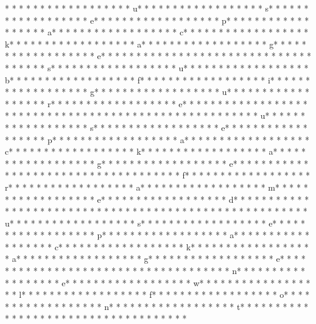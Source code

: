 * * *  * * *  * * *  *  * * *  *  * * *  * u* * *  * * *  * * *  *  * * *  *  * * *  * s* * *  * * *  * * *  *  * * *  *  * * *  * e* * *  * * *  * * *  *  * * *  *  * * *  * p* * *  * * *  * * *  *  * * *  *  * * *  * a* * *  * * *  * * *  *  * * *  *  * * *  * c* * *  * * *  * * *  *  * * *  *  * * *  * k* * *  * * *  * * *  *  * * *  *  * * *  * a* * *  * * *  * * *  *  * * *  *  * * *  * g* * *  * * *  * * *  *  * * *  *  * * *  * e* * *  * * *  * * *  *  * * *  *  * * *  * {* * *  * * *  * * *  *  * * *  *  * * *  * s* * *  * * *  * * *  *  * * *  *  * * *  * u* * *  * * *  * * *  *  * * *  *  * * *  * b* * *  * * *  * * *  *  * * *  *  * * *  * f* * *  * * *  * * *  *  * * *  *  * * *  * i* * *  * * *  * * *  *  * * *  *  * * *  * g* * *  * * *  * * *  *  * * *  *  * * *  * u* * *  * * *  * * *  *  * * *  *  * * *  * r* * *  * * *  * * *  *  * * *  *  * * *  * e* * *  * * *  * * *  *  * * *  *  * * *  * }* * *  * * *  * * *  *  * * *  *  * * *  * 
* * *  * * *  * * *  *  * * *  *  * * *  * u* * *  * * *  * * *  *  * * *  *  * * *  * s* * *  * * *  * * *  *  * * *  *  * * *  * e* * *  * * *  * * *  *  * * *  *  * * *  * p* * *  * * *  * * *  *  * * *  *  * * *  * a* * *  * * *  * * *  *  * * *  *  * * *  * c* * *  * * *  * * *  *  * * *  *  * * *  * k* * *  * * *  * * *  *  * * *  *  * * *  * a* * *  * * *  * * *  *  * * *  *  * * *  * g* * *  * * *  * * *  *  * * *  *  * * *  * e* * *  * * *  * * *  *  * * *  *  * * *  * {* * *  * * *  * * *  *  * * *  *  * * *  * f* * *  * * *  * * *  *  * * *  *  * * *  * r* * *  * * *  * * *  *  * * *  *  * * *  * a* * *  * * *  * * *  *  * * *  *  * * *  * m* * *  * * *  * * *  *  * * *  *  * * *  * e* * *  * * *  * * *  *  * * *  *  * * *  * d* * *  * * *  * * *  *  * * *  *  * * *  * }* * *  * * *  * * *  *  * * *  *  * * *  * 
* * *  * * *  * * *  *  * * *  *  * * *  * u* * *  * * *  * * *  *  * * *  *  * * *  * s* * *  * * *  * * *  *  * * *  *  * * *  * e* * *  * * *  * * *  *  * * *  *  * * *  * p* * *  * * *  * * *  *  * * *  *  * * *  * a* * *  * * *  * * *  *  * * *  *  * * *  * c* * *  * * *  * * *  *  * * *  *  * * *  * k* * *  * * *  * * *  *  * * *  *  * * *  * a* * *  * * *  * * *  *  * * *  *  * * *  * g* * *  * * *  * * *  *  * * *  *  * * *  * e* * *  * * *  * * *  *  * * *  *  * * *  * {* * *  * * *  * * *  *  * * *  *  * * *  * n* * *  * * *  * * *  *  * * *  *  * * *  * e* * *  * * *  * * *  *  * * *  *  * * *  * w* * *  * * *  * * *  *  * * *  *  * * *  * l* * *  * * *  * * *  *  * * *  *  * * *  * f* * *  * * *  * * *  *  * * *  *  * * *  * o* * *  * * *  * * *  *  * * *  *  * * *  * n* * *  * * *  * * *  *  * * *  *  * * *  * t* * *  * * *  * * *  *  * * *  *  * * *  * }* * *  * * *  * * *  *  * * *  *  * * *  * 
